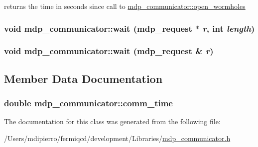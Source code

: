 returns the time in seconds since call to \hyperlink{classmdp__communicator_af2c43869a689b8f1d020d4c4995b0cee}{mdp\_\-communicator::open\_\-wormholes} \hypertarget{classmdp__communicator_aca879bd68c152a2831d37455c7bffcc9}{
\subsubsection[{wait}]{\setlength{\rightskip}{0pt plus 5cm}void mdp\_\-communicator::wait ({\bf mdp\_\-request} $\ast$ {\em r}, \/  int {\em length})}}
\label{classmdp__communicator_aca879bd68c152a2831d37455c7bffcc9}
\hypertarget{classmdp__communicator_ae63ed716fd7a459031dc2fc76da7c258}{
\subsubsection[{wait}]{\setlength{\rightskip}{0pt plus 5cm}void mdp\_\-communicator::wait ({\bf mdp\_\-request} \& {\em r})}}
\label{classmdp__communicator_ae63ed716fd7a459031dc2fc76da7c258}


\subsection{Member Data Documentation}
\hypertarget{classmdp__communicator_a0292893d19938e48bac585bdff3d7831}{
\subsubsection[{comm\_\-time}]{\setlength{\rightskip}{0pt plus 5cm}double {\bf mdp\_\-communicator::comm\_\-time}}}
\label{classmdp__communicator_a0292893d19938e48bac585bdff3d7831}


The documentation for this class was generated from the following file:\begin{DoxyCompactItemize}
\item 
/Users/mdipierro/fermiqcd/development/Libraries/\hyperlink{mdp__communicator_8h}{mdp\_\-communicator.h}\end{DoxyCompactItemize}
